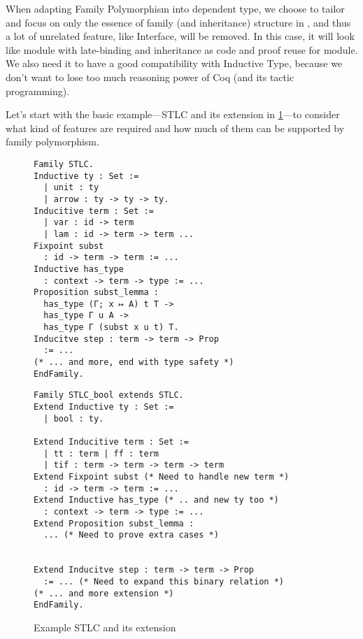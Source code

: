 When adapting Family Polymorphism into dependent type, we choose to tailor and focus on only the essence of family (and inheritance) structure in \citet{zm2017}, and thus a lot of unrelated feature, like Interface, will be removed. In this case, it will look like module with late-binding and inheritance as code and proof reuse for module. We also need it to have a good compatibility with Inductive Type, because we don't want to lose too much reasoning power of Coq (and its tactic programming). 

Let's start with the basic example---STLC and its extension in \cref{fig:STLC-example}---to consider what kind of features are required and how much of them can be supported by family polymorphism.

\begin{figure}
  \begin{minipage}[t]{0.47\linewidth}
\begin{verbatim}
Family STLC.
Inductive ty : Set :=
  | unit : ty
  | arrow : ty -> ty -> ty.
Inducitive term : Set := 
  | var : id -> term 
  | lam : id -> term -> term ...
Fixpoint subst 
  : id -> term -> term := ...
Inductive has_type 
  : context -> term -> type := ...
Proposition subst_lemma :
  has_type (Γ; x ↦ A) t T ->
  has_type Γ u A ->
  has_type Γ (subst x u t) T.
Inducitve step : term -> term -> Prop 
  := ...
(* ... and more, end with type safety *)
EndFamily.
\end{verbatim}
  \end{minipage}
  \begin{minipage}[t]{0.47\linewidth}
\begin{verbatim}
Family STLC_bool extends STLC.
Extend Inductive ty : Set :=
  | bool : ty.

Extend Inducitive term : Set := 
  | tt : term | ff : term 
  | tif : term -> term -> term -> term
Extend Fixpoint subst (* Need to handle new term *)
  : id -> term -> term := ...
Extend Inductive has_type (* .. and new ty too *)
  : context -> term -> type := ...
Extend Proposition subst_lemma :
  ... (* Need to prove extra cases *)


Extend Inducitve step : term -> term -> Prop 
  := ... (* Need to expand this binary relation *)
(* ... and more extension *)
EndFamily.
\end{verbatim}
  \end{minipage}
  \caption{Example STLC and its extension}\label{fig:STLC-example}
\end{figure}


